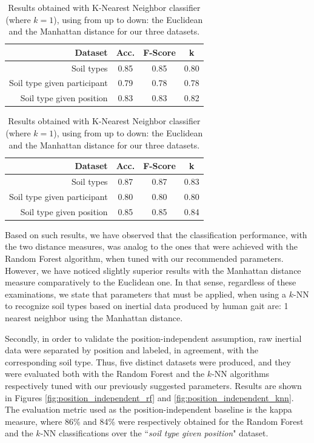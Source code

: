 \documentclass[conference]{IEEEtran}
\begin{document}
\begin{table}[!ht]
  \centering
  \caption{Results obtained with K-Nearest Neighbor classifier (where $k=1$), using from up to down: the Euclidean and the Manhattan distance for our three datasets.}
  \label{tab:results_knn}
  \begin{tabular}{rccc}
    \toprule
    \textbf{Dataset}&\textbf{Acc.}&\textbf{F-Score}&\textbf{k}\\
    \midrule
   	Soil types&0.85&0.85&0.80\\
    Soil type given participant&0.79&0.78&0.78\\
    Soil type given position&0.83&0.83&0.82\\
\end{tabular}
\begin{tabular}{rccc}
    \toprule
    \textbf{Dataset}&\textbf{Acc.}&\textbf{F-Score}&\textbf{k}\\
    \midrule
   	Soil types&0.87&0.87&0.83\\
    Soil type given participant&0.80&0.80&0.80\\
    Soil type given position&0.85&0.85&0.84\\
  \bottomrule
\end{tabular}
\end{table}

Based on such results, we have observed that the classification performance, with the two distance measures, was analog to the ones that were achieved with the Random Forest algorithm, when tuned with our recommended parameters. However, we have noticed slightly superior results with the Manhattan distance measure comparatively to the Euclidean one. In that sense, regardless of these examinations, we state that parameters that must be applied, when using a $k$-NN to recognize soil types based on inertial data produced by human gait are: 1 nearest neighbor using the Manhattan distance.

Secondly, in order to validate the position-independent assumption, raw inertial data were separated by position and labeled, in agreement, with the corresponding soil type. Thus, five distinct datasets were produced, and they were evaluated both with the Random Forest and the $k$-NN algorithms respectively tuned with our previously suggested parameters. Results are shown in Figures \ref{fig:position_independent_rf} and \ref{fig:position_independent_knn}. The evaluation metric used as the position-independent baseline is the kappa measure, where 86\% and 84\% were respectively obtained for the Random Forest and the $k$-NN classifications over the \textquotedblleft\textit{soil type given position}" dataset.
\end{document}
